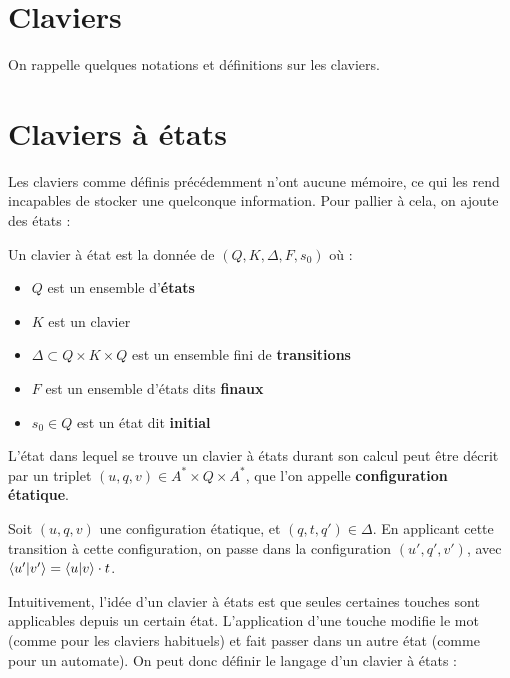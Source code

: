 \documentclass[12pt, a4paper]{article}
\begin{document}
    \section{Claviers}
    On rappelle quelques notations et définitions sur les claviers.
    



	\section{Claviers à états}
    Les claviers comme définis précédemment n'ont aucune mémoire, ce qui les rend incapables de stocker une quelconque information.
    Pour pallier à cela, on ajoute des états :
    \begin{defétats}
        Un clavier à état est la donnée de $(Q,K,\Delta ,F,s_0)$ où :
        \begin{itemize}
            \item $Q$ est un ensemble d'\textbf{états}
            \item $K$ est un clavier
            \item $\Delta \subset Q \times K \times Q$ est un ensemble fini de \textbf{transitions}
            \item $F$ est un ensemble d'états dits \textbf{finaux}
            \item $s_0 \in Q$ est un état dit \textbf{initial}
        \end{itemize}
    \end{defétats}
    \begin{configétats}
        L'état dans lequel se trouve un clavier à états durant son calcul peut être décrit par un triplet $(u,q,v) \in A^* \times Q \times A^*$, que l'on appelle \textbf{configuration étatique}.
    \end{configétats}
    \begin{effettouche}
        Soit $(u,q,v)$ une configuration étatique, et $(q,t,q') \in \Delta$. En applicant cette transition à cette configuration, on passe dans la configuration $(u',q',v')$, avec $\left\langle u' \middle| v' \right\rangle = \left\langle u \middle| v \right\rangle \cdot t$.
    \end{effettouche}
    Intuitivement, l'idée d'un clavier à états est que seules certaines touches sont applicables depuis un certain état. L'application d'une touche modifie le mot (comme pour les claviers habituels)
    et fait passer dans un autre état (comme pour un automate).
    On peut donc définir le langage d'un clavier à états :
\end{document}
